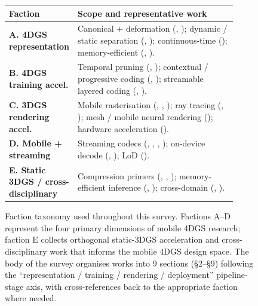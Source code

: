 \begin{figure}[t]
\centering
\small
\begin{tabular}{p{0.18\linewidth}p{0.72\linewidth}}
\toprule
\textbf{Faction} & \textbf{Scope and representative work} \\
\midrule
\textbf{A. 4DGS representation} &
Canonical + deformation (\cite{wu20244dgs}, \cite{yang2023deformable3dgs}); dynamic / static separation (\cite{yuan20254dgs1k}, \cite{zhang2024mega4dgsacceleration}); continuous-time (\cite{wang2026retimegs}); memory-efficient (\cite{shi2025sparse4dgs}, \cite{ren2026cubifygs}). \\
\textbf{B. 4DGS training accel.} &
Temporal pruning (\cite{lee2025omg4}, \cite{tu2025speede3dgs}); contextual / progressive coding (\cite{chen20254dgscc}, \cite{li2026pd4dgs}); streamable layered coding (\cite{yin2026cags}, \cite{zheng20254dgcpro}). \\
\textbf{C. 3DGS rendering accel.} &
Mobile rasterisation (\cite{du2026mobilegs}, \cite{du2026fluxgs}, \cite{huang2025seele}); ray tracing (\cite{liu20254dgrt}, \cite{ghosh2026gsnfs}); mesh / mobile neural rendering (\cite{feng2025lumina}); hardware acceleration (\cite{oh2025neo}). \\
\textbf{D. Mobile + streaming} &
Streaming codecs (\cite{li2026pd4dgs}, \cite{ke2025streamstgs}, \cite{veicht2026zipsplat}, \cite{yu2026codecsplat}); on-device decode (\cite{ghosh2026gsnfs}, \cite{shi2026evogs}); LoD (\cite{shi2026evogs}). \\
\textbf{E. Static 3DGS / cross-disciplinary} &
Compression primers (\cite{fan2023lightgaussian}, \cite{chen2024hacpp}, \cite{navaneet2023compact3d}); memory-efficient inference (\cite{liu2024efficientgs}, \cite{li2026vedal}); cross-domain (\cite{huang2026gaussianfluent}, \cite{feng2025lumina}). \\
\bottomrule
\end{tabular}
\caption{Faction taxonomy used throughout this survey. Factions A--D
represent the four primary dimensions of mobile 4DGS research; faction
E collects orthogonal static-3DGS acceleration and cross-disciplinary
work that informs the mobile 4DGS design space. The body of the survey
organises works into 9 sections (\S2--\S9) following the
``representation / training / rendering / deployment''
pipeline-stage axis, with cross-references back to the appropriate
faction where needed.}
\label{fig:taxonomy}
\end{figure}


